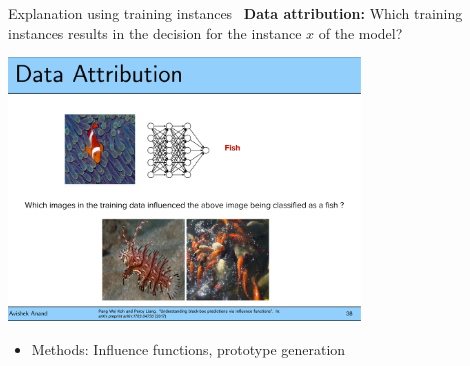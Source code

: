 \documentclass[11pt,compress,t,notes=noshow, aspectratio=169, xcolor=table]{beamer}
\begin{document}
\begin{frame}{Explanation using training instances~}
	\textbf{Data attribution:} Which training instances results in the decision for the instance $x$ of the model?
	\begin{center}
		\includegraphics[page=1, width=0.7\textwidth]{figure/prototypes-fish.pdf}
	\end{center}
	\begin{itemize}
		\item Methods:
		Influence functions, prototype generation
	\end{itemize}
\end{frame}


\end{document}
